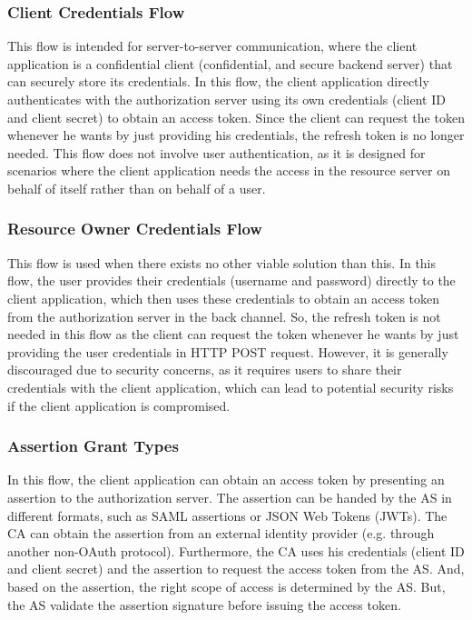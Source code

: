 \documentclass[../memoire.tex]{subfiles}
\begin{document}
\subsubsection*{Client Credentials Flow}

This flow is intended for server-to-server communication, where the client application is a confidential client (confidential, and secure backend server) that can securely store its credentials. In this flow, the client application directly authenticates with the authorization server using its own credentials (client ID and client secret) to obtain an access token. Since the client can request the token whenever he wants by just providing his credentials, the refresh token is no longer needed. This flow does not involve user authentication, as it is designed for scenarios where the client application needs the access in the resource server on behalf of itself rather than on behalf of a user.


\subsubsection*{Resource Owner Credentials Flow}

This flow is used when there exists no other viable solution than this. In this flow, the user provides their credentials (username and password) directly to the client application, which then uses these credentials to obtain an access token from the authorization server in the back channel. So, the refresh token is not needed in this flow as the client can request the token whenever he wants by just providing the user credentials in HTTP POST request. However, it is generally discouraged due to security concerns, as it requires users to share their credentials with the client application, which can lead to potential security risks if the client application is compromised\cite{rfc9700}.

\subsubsection*{Assertion Grant Types}

In this flow, the client application can obtain an access token by presenting an assertion to the authorization server. The assertion can be handed by the AS in different formats, such as SAML assertions or JSON Web Tokens (JWTs). The CA can obtain the assertion from an external identity provider (e.g. through another non-OAuth protocol). Furthermore, the CA uses his credentials (client ID and client secret) and the assertion to request the access token from the AS. And, based on the assertion, the right scope of access is determined by the AS. But, the AS validate the assertion signature before issuing the access token.  
\end{document}
